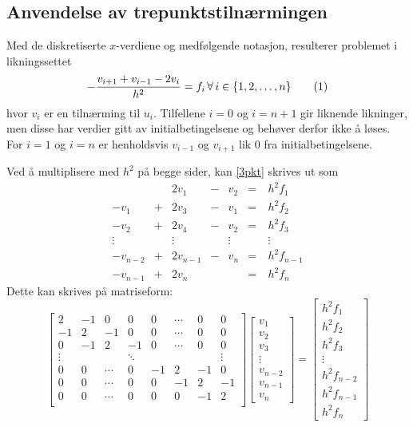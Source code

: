 \documentclass[12pt,norsk,a4paper]{report}
\newcommand{\eqtag}[1]{\refstepcounter{equation}\tag{\theequation}\label{#1}}
\begin{document}
\subsection{Anvendelse av trepunktstilnærmingen}
Med de diskretiserte \(x\)-verdiene og medfølgende notasjon, resulterer problemet i likningssettet
\[
-\frac{v_{i+1}+v_{i-1}-2v_i}{h^2}=f_i\,\forall\, i\in\qty{1,2,\ldots,n} \eqtag{3pkt}
\]
hvor \(v_i\) er en tilnærming til \(u_i\). Tilfellene \(i=0\) og \(i=n+1\) gir liknende likninger, men disse har verdier gitt av initialbetingelsene og behøver derfor ikke å løses. For \(i=1\) og \(i=n\) er henholdsvis \(v_{i-1}\) og \(v_{i+1}\) lik \(0\) fra initialbetingelsene.

Ved å multiplisere med \(h^2\) på begge sider, kan \vref{3pkt} skrives ut som
\begin{equation*}
\begin{array}{ccccccc}
&& 2v_1 &-& v_2 &=& h^2f_1\\
-v_1 &+& 2v_3 &-& v_1 &=& h^2f_2\\
-v_2 &+& 2v_4 &-& v_2 &=& h^2f_3\\
\vdots && \vdots && \vdots &\quad& \vdots\\
-v_{n-2} &+& 2v_{n-1} &-& v_{n} &=& h^2f_{n-1}\\
-v_{n-1} &+& 2v_n && &=& h^2f_n
\end{array}
\end{equation*}
Dette kan skrives på matriseform:
\[
\begin{bmatrix}
2 & -1 & 0 & 0 & 0 & \cdots & 0 & 0\\
-1 & 2 & -1 & 0 & 0 & \cdots & 0 & 0\\
0 & -1 & 2 & -1 & 0 & \cdots & 0 & 0\\
\vdots & & & \ddots & & & & \vdots\\
0 & 0 & \cdots & 0 & -1 & 2 & -1 & 0\\
0 & 0 & \cdots & 0 & 0 & -1 & 2 & -1\\
0 & 0 & \cdots & 0 & 0 & 0 & -1 & 2\\
\end{bmatrix}
\begin{bmatrix}
v_1\\
v_2\\
v_3\\
\vdots\\
v_{n-2}\\
v_{n-1}\\
v_n
\end{bmatrix}
=
\begin{bmatrix}
h^2f_1\\
h^2f_2\\
h^2f_3\\
\vdots\\
h^2f_{n-2}\\
h^2f_{n-1}\\
h^2f_n
\end{bmatrix}
\]
\end{document}
